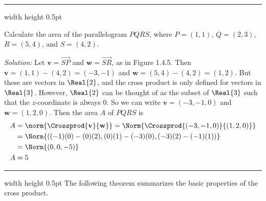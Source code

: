 \hrule width \textwidth height 0.5pt
\begin{exmp}
 Calculate the area of the parallelogram $PQRS$, where $P = (1,1)$, $Q = (2,3)$, $R = (5,4)$, and
 $S = (4,2)$.\vspace{1mm}
 \piccaption[]{}
 \par\noindent\emph{Solution:} Let $\textbf{v} = \overrightarrow{SP}$ and $\textbf{w} = \overrightarrow{SR}$, as in
 Figure 1.4.5. Then $\textbf{v} = (1,1) - (4,2) = (-3,-1)$ and $\textbf{w} = (5,4) - (4,2) = (1,2)$. But these are
 vectors in $\Real{2}$, and the cross product is only defined for vectors in $\Real{3}$. However, $\Real{2}$ can
 be thought of as the subset of $\Real{3}$ such that the $z$-coordinate is always $0$. So we can write
 $\textbf{v} = (-3,-1,0)$ and $\textbf{w} = (1,2,0)$. Then the area $A$ of $PQRS$ is
 \begin{align*}
 A &= \norm{\Crossprod{\textbf{v}}{\textbf{w}}} = \Norm{\Crossprod{(-3,-1,0)}{(1,2,0)}}\\
 &= \Norm{((-1)(0) - (0)(2), (0)(1) - (-3)(0), (-3)(2) - (-1)(1))}\\
 &= \Norm{(0,0, -5)}\\
 A &= 5
 \end{align*}
\end{exmp}
\hrule width \textwidth height 0.5pt
\newpage
The following theorem summarizes the basic properties of the cross product.

